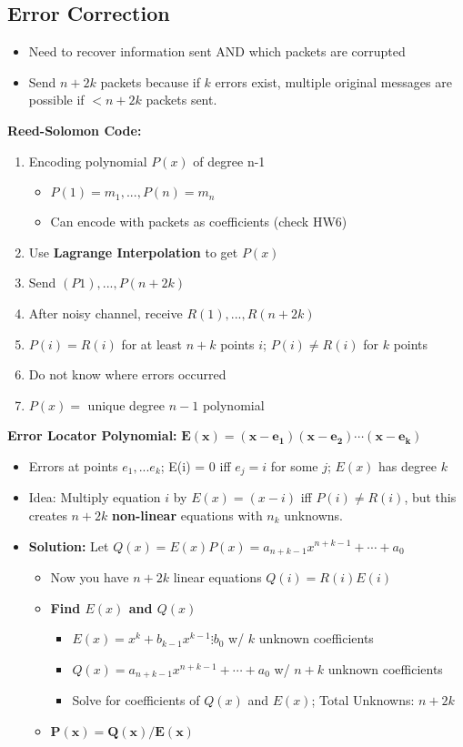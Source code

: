 \documentclass{article}\usepackage{amsmath,amssymb,amsthm,tikz,tkz-graph,color,chngpage,soul,hyperref,csquotes,graphicx,floatrow, listings,polynom}\newcommand*{\QEDB}{\hfill\ensuremath{\square}}\newtheorem*{prop}{Proposition}\renewcommand{\theenumi}{\alph{enumi}}\usepackage[shortlabels]{enumitem}\usepackage[nobreak=true]{mdframed}\usetikzlibrary{matrix,calc}\MakeOuterQuote{"}\usepackage[margin=0.75in]{geometry} \newtheorem{theorem}{Theorem}\newcommand{\Z}{\mathbb Z}\newcommand{\R}{\mathbb R}\newcommand{\Q}{\mathbb Q}\newcommand{\N}{\mathbb N}\newcommand{\x}[1]{\textrm{ #1 }}\newcommand{\pr}{\textrm{Pr}}
\begin{document}
\subsection*{Error Correction}
\begin{itemize}
\item Need to recover information sent AND which packets are corrupted
\item Send $n+2k$ packets because if $k$ errors exist, multiple original messages are possible if $< n+2k$ packets sent.
\end{itemize}
\begin{mdframed}
\textbf{Reed-Solomon Code:}
\begin{enumerate}[1.]
\item Encoding polynomial $P(x)$ of degree n-1
    \begin{itemize}
    \item $P(1) = m_1,..., P(n) = m_n$
    \item Can encode with packets as coefficients (check HW6)
    \end{itemize}
\item Use \textbf{Lagrange Interpolation} to get $P(x)$
\item Send $(P1), ..., P(n+2k)$
\item After noisy channel, receive $R(1), ..., R(n+2k)$
\item $P(i) = R(i)$ for at least $n+k$ points $i$; $P(i) \ne R(i)$ for $k$ points
\item Do not know where errors occurred
\item $P(x) =$ unique degree $n-1$ polynomial
\end{enumerate}
\textbf{Error Locator Polynomial:} $\boldsymbol{E(x)=(x-e_1)(x-e_2)\cdots(x-e_k)}$
\begin{itemize}
\item Errors at points $e_1, ... e_k$; E(i) = 0 iff $e_j = i$ for some $j$; $E(x)$ has degree $k$
\item Idea: Multiply equation $i$ by $E(x) = (x - i)$ iff $P(i) \ne R(i)$, but this creates $n+2k$ \textbf{non-linear} equations with $n_k$ unknowns.
\item \textbf{Solution:} Let $Q(x) = E(x)P(x) = a_{n+k-1}x^{n+k-1} + \cdots + a_0$
    \begin{itemize}
    \item Now you have $n+2k$ linear equations $Q(i) = R(i)E(i)$
    \item \textbf{Find $E(x)$ and $Q(x)$}
        \begin{itemize}
            \item $E(x) = x^k+b_{k-1}x^{k-1}\vdots b_0$ w/ $k$ unknown coefficients
            \item $Q(x) = a_{n+k-1}x^{n+k-1} + \cdots + a_0$ w/ $n+k$ unknown coefficients
            \item Solve for coefficients of $Q(x)$ and $E(x)$; Total Unknowns: $n+2k$
        \end{itemize}
    \item $\boldsymbol{P(x) = Q(x)/E(x)}$
    \end{itemize}
\end{itemize}
\end{mdframed}
\end{document}
